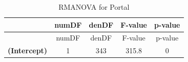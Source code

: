\documentclass[]{article}
\begin{document}
\begin{longtable}[]{@{}ccccc@{}}
\caption{RMANOVA for Portal}\tabularnewline
\toprule
\begin{minipage}[b]{0.25\columnwidth}\centering\strut
~\strut
\end{minipage} & \begin{minipage}[b]{0.10\columnwidth}\centering\strut
numDF\strut
\end{minipage} & \begin{minipage}[b]{0.10\columnwidth}\centering\strut
denDF\strut
\end{minipage} & \begin{minipage}[b]{0.12\columnwidth}\centering\strut
F-value\strut
\end{minipage} & \begin{minipage}[b]{0.12\columnwidth}\centering\strut
p-value\strut
\end{minipage}\tabularnewline
\midrule
\endfirsthead
\toprule
\begin{minipage}[b]{0.25\columnwidth}\centering\strut
~\strut
\end{minipage} & \begin{minipage}[b]{0.10\columnwidth}\centering\strut
numDF\strut
\end{minipage} & \begin{minipage}[b]{0.10\columnwidth}\centering\strut
denDF\strut
\end{minipage} & \begin{minipage}[b]{0.12\columnwidth}\centering\strut
F-value\strut
\end{minipage} & \begin{minipage}[b]{0.12\columnwidth}\centering\strut
p-value\strut
\end{minipage}\tabularnewline
\midrule
\endhead
\begin{minipage}[t]{0.25\columnwidth}\centering\strut
\textbf{(Intercept)}\strut
\end{minipage} & \begin{minipage}[t]{0.10\columnwidth}\centering\strut
1\strut
\end{minipage} & \begin{minipage}[t]{0.10\columnwidth}\centering\strut
343\strut
\end{minipage} & \begin{minipage}[t]{0.12\columnwidth}\centering\strut
315.8\strut
\end{minipage} & \begin{minipage}[t]{0.12\columnwidth}\centering\strut
0\strut
\end{minipage}\tabularnewline

\end{longtable}
\end{document}
